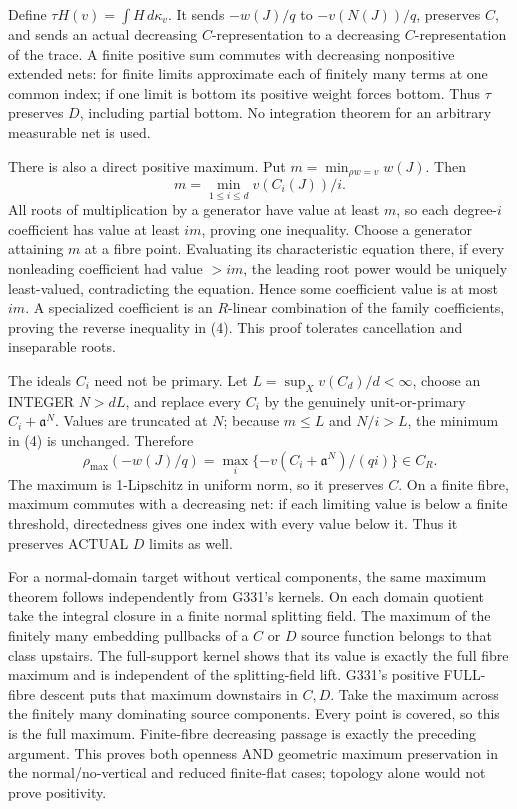 \documentclass[11pt]{article}
\begin{document}
Define $\tau H(v)=\int H\,d\kappa_v$. It sends $-w(J)/q$ to $-v(N(J))/q$, preserves $C$, and sends an actual decreasing $C$-representation to a decreasing $C$-representation of the trace. A finite positive sum commutes with decreasing nonpositive extended nets: for finite limits approximate each of finitely many terms at one common index; if one limit is bottom its positive weight forces bottom. Thus $\tau$ preserves $D$, including partial bottom. No integration theorem for an arbitrary measurable net is used.

There is also a direct positive maximum. Put $m=\min_{\rho w=v}w(J)$. Then
\[
m=\min_{1\le i\le d}v(C_i(J))/i.                      \tag{4}
\]
All roots of multiplication by a generator have value at least $m$, so each degree-$i$ coefficient has value at least $im$, proving one inequality. Choose a generator attaining $m$ at a fibre point. Evaluating its characteristic equation there, if every nonleading coefficient had value $>im$, the leading root power would be uniquely least-valued, contradicting the equation. Hence some coefficient value is at most $im$. A specialized coefficient is an $R$-linear combination of the family coefficients, proving the reverse inequality in (4). This proof tolerates cancellation and inseparable roots.

The ideals $C_i$ need not be primary. Let $L=\sup_X v(C_d)/d<\infty$, choose an INTEGER $N>dL$, and replace every $C_i$ by the genuinely unit-or-primary $C_i+\mathfrak a^N$. Values are truncated at $N$; because $m\le L$ and $N/i>L$, the minimum in (4) is unchanged. Therefore
\[
\rho_{\max}(-w(J)/q)=\max_i\{-v(C_i+\mathfrak a^N)/(qi)\}\in C_R. \tag{5}
\]
The maximum is 1-Lipschitz in uniform norm, so it preserves $C$. On a finite fibre, maximum commutes with a decreasing net: if each limiting value is below a finite threshold, directedness gives one index with every value below it. Thus it preserves ACTUAL $D$ limits as well.

For a normal-domain target without vertical components, the same maximum theorem follows independently from G331's kernels. On each domain quotient take the integral closure in a finite normal splitting field. The maximum of the finitely many embedding pullbacks of a $C$ or $D$ source function belongs to that class upstairs. The full-support kernel shows that its value is exactly the full fibre maximum and is independent of the splitting-field lift. G331's positive FULL-fibre descent puts that maximum downstairs in $C,D$. Take the maximum across the finitely many dominating source components. Every point is covered, so this is the full maximum. Finite-fibre decreasing passage is exactly the preceding argument. This proves both openness AND geometric maximum preservation in the normal/no-vertical and reduced finite-flat cases; topology alone would not prove positivity.
\end{document}
